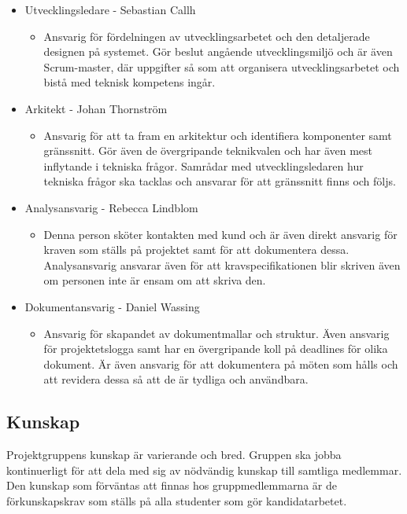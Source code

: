 \begin{itemize}
\begin{itemize}
	\end{itemize}
\item Utvecklingsledare - Sebastian Callh
	\begin{itemize}
		\item Ansvarig för fördelningen av utvecklingsarbetet och den detaljerade designen på systemet. Gör beslut angående utvecklingsmiljö och är även Scrum-master, där uppgifter så som att organisera utvecklingsarbetet och bistå med teknisk kompetens ingår.
	\end{itemize}
\item Arkitekt - Johan Thornström
	\begin{itemize}
		\item Ansvarig för att ta fram en arkitektur och identifiera komponenter samt gränssnitt. Gör även de övergripande teknikvalen och har även mest inflytande i tekniska frågor. Samrådar med utvecklingsledaren hur tekniska frågor ska tacklas och ansvarar för att gränssnitt finns och följs.
	\end{itemize}
\item Analysansvarig - Rebecca Lindblom
	\begin{itemize}
		\item Denna person sköter kontakten med kund och är även direkt ansvarig för kraven som ställs på projektet samt för att dokumentera dessa. Analysansvarig ansvarar även för att kravspecifikationen blir skriven även om personen inte är ensam om att skriva den.
	\end{itemize}
\bigskip
\item Dokumentansvarig - Daniel Wassing
	\begin{itemize}
		\item Ansvarig för skapandet av dokumentmallar och struktur. Även ansvarig för projektetslogga samt har en övergripande koll på deadlines för olika dokument. Är även ansvarig för att dokumentera på möten som hålls och att revidera dessa så att de är tydliga och användbara.
	\end{itemize}
\end{itemize}

\subsection{Kunskap}
Projektgruppens kunskap är varierande och bred. Gruppen ska jobba kontinuerligt för att dela med sig av nödvändig kunskap till samtliga medlemmar.
Den kunskap som förväntas att finnas hos gruppmedlemmarna är de förkunskapskrav som ställs på alla studenter som gör kandidatarbetet.

